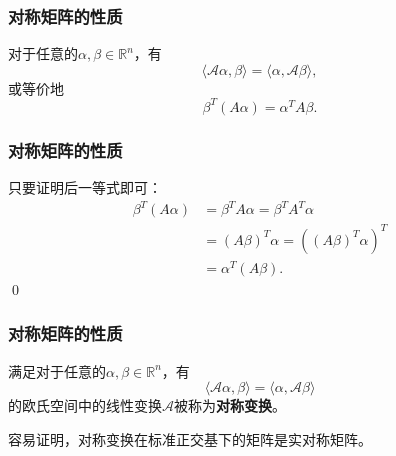 
\begin{frame}
\frametitle{对称矩阵的性质}

\begin{lem}
对于任意的$\alpha, \beta \in \mathbb{R}^n$，有
\[\langle \mathscr{A}\alpha, \beta \rangle = \langle \alpha, \mathscr{A}\beta \rangle,\]
或等价地
\[\beta^T (A\alpha) = \alpha^T A \beta.\]
\end{lem}

\end{frame}


\begin{frame}
\frametitle{对称矩阵的性质}

\startproof[bg=yellow, fg=red]
只要证明后一等式即可：
\begin{align*}
    \beta^T (A\alpha) & = \beta^T A \alpha = \beta^T A^T \alpha \\
    & = (A\beta)^T \alpha = \left( (A\beta)^T \alpha \right)^T \\
    & = \alpha^T (A\beta).
\end{align*}
\qed

\end{frame}


\begin{frame}
\frametitle{对称矩阵的性质}

\begin{Def}
满足对于任意的$\alpha, \beta \in \mathbb{R}^n$，有
\[\langle \mathscr{A}\alpha, \beta \rangle = \langle \alpha, \mathscr{A}\beta \rangle\]
的欧氏空间中的线性变换$\mathscr{A}$被称为{\bfseries 对称变换}。
\end{Def}

\pause
\vspace{2em}

容易证明，对称变换在标准正交基下的矩阵是实对称矩阵。

\end{frame}


